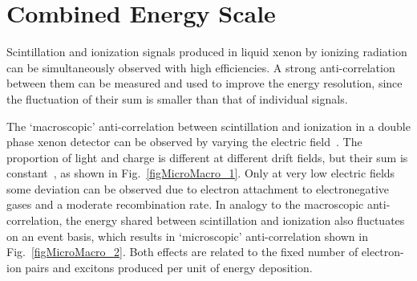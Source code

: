 \section{Combined Energy Scale}
\label{secCES}

Scintillation and ionization signals produced in liquid xenon by ionizing radiation can be simultaneously observed with high efficiencies. A strong anti-correlation between them can be measured and used to improve the energy resolution, since the fluctuation of their sum is smaller than that of individual signals.

The `macroscopic' anti-correlation between scintillation and ionization in a double phase xenon detector can be observed by varying the electric field~\cite{CES_Kubota}. The proportion of light and charge is different at different drift fields, but their sum is constant~\cite{CES_Conti, CES_Aprile}, as shown in Fig.~\ref{figMicroMacro_1}. Only at very low electric fields some deviation can be observed due to electron attachment to electronegative gases and a moderate recombination rate. In analogy to the macroscopic anti-correlation, the energy shared  between scintillation and ionization also fluctuates on an event basis, which results in `microscopic' anti-correlation shown in Fig.~\ref{figMicroMacro_2}. Both effects are related to the fixed number of electron-ion pairs and excitons produced per unit of energy deposition.

